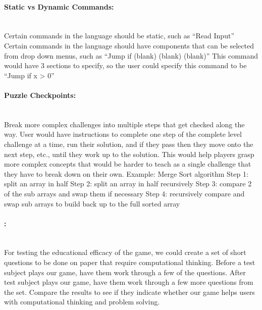 
\paragraph{Static vs Dynamic Commands:} ~\\
Certain commands in the language should be static, such as “Read Input”
Certain commands in the language should have components that can be selected from drop down menus, such as “Jump if (blank) (blank) (blank)”
  This command would have 3 sections to specify, so the user could specify this command to be “Jump if x > 0”


\paragraph{Puzzle Checkpoints:} ~\\
Break more complex challenges into multiple steps that get checked along the way.
User would have instructions to complete one step of the complete level challenge at a time, run their solution, and if they pass then they move onto the next step, etc., until they work up to the solution.
This would help players grasp more complex concepts that would be harder to teach as a single challenge that they have to break down on their own.
Example: Merge Sort algorithm
  Step 1: split an array in half
  Step 2: split an array in half recursively
  Step 3: compare 2 of the sub arrays and swap them if necessary
  Step 4: recursively compare and swap sub arrays to build back up to the full sorted array


\paragraph{:} ~\\
For testing the educational efficacy of the game, we could create a set of short questions to be done on paper that require computational thinking.
Before a test subject plays our game, have them work through a few of the questions.
After test subject plays our game, have them work through a few more questions from the set.
Compare the results to see if they indicate whether our game helps users with computational thinking and problem solving.




